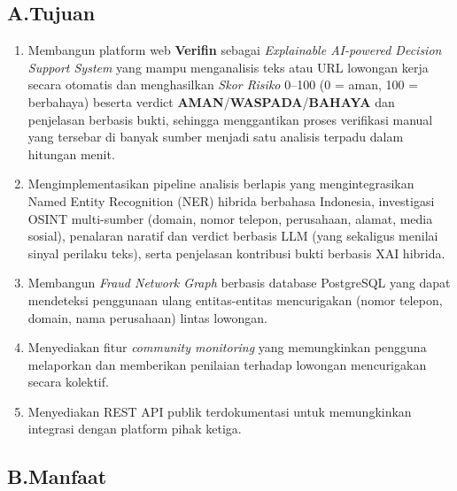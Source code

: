 \documentclass[12pt,a4paper]{article}
\begin{document}
\subsection*{A.\quad Tujuan}

\begin{enumerate}[label=\textbf{\arabic*.}]
\item Membangun platform web \textbf{Verifin} sebagai \textit{Explainable AI-powered Decision
      Support System} yang mampu menganalisis teks atau URL lowongan kerja secara otomatis dan
      menghasilkan \textit{Skor Risiko} 0--100 (0 = aman, 100 = berbahaya) beserta verdict
      \textbf{AMAN}\allowbreak/\textbf{WASPADA}\allowbreak/\textbf{BAHAYA} dan penjelasan berbasis
      bukti, sehingga menggantikan proses verifikasi manual yang tersebar di banyak sumber
      menjadi satu analisis terpadu dalam hitungan menit.

\item Mengimplementasikan pipeline analisis berlapis yang mengintegrasikan Named Entity Recognition
      (NER) hibrida berbahasa Indonesia, investigasi OSINT multi-sumber
      (domain, nomor telepon, perusahaan, alamat, media sosial), penalaran naratif dan verdict
      berbasis LLM (yang sekaligus menilai sinyal perilaku teks), serta penjelasan kontribusi
      bukti berbasis XAI hibrida.

\item Membangun \textit{Fraud Network Graph} berbasis database PostgreSQL yang dapat mendeteksi
      penggunaan ulang entitas-entitas mencurigakan (nomor telepon, domain, nama perusahaan) lintas
      lowongan.

\item Menyediakan fitur \textit{community monitoring} yang memungkinkan pengguna melaporkan dan
      memberikan penilaian terhadap lowongan mencurigakan secara kolektif.

\item Menyediakan REST API publik terdokumentasi untuk memungkinkan integrasi dengan platform
      pihak ketiga.
\end{enumerate}

\subsection*{B.\quad Manfaat}
\end{document}

